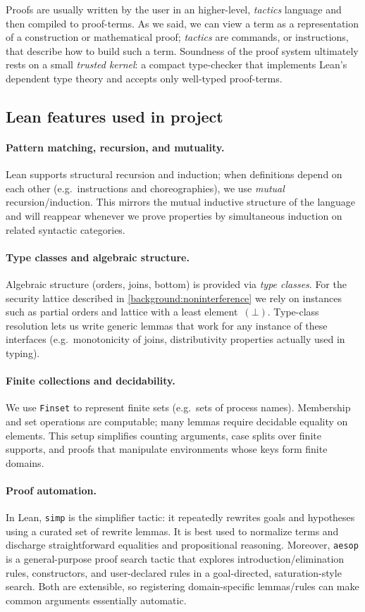 \documentclass[12pt,a4paper,twoside]{book}
\begin{document}
Proofs are usually written by the user in an higher-level, \emph{tactics} language and then compiled to proof-terms. 
As we said, we can view a term as a representation of a construction or mathematical proof; \emph{tactics} are commands, or instructions, that describe how to build such a term.
Soundness of the proof system ultimately rests on a small \emph{trusted kernel}: a compact type-checker that implements Lean's dependent type theory and accepts only well-typed proof-terms\cite{de2015lean}.

\subsection{Lean features used in project}
\paragraph{Pattern matching, recursion, and mutuality.}
Lean supports structural recursion and induction; when definitions depend on each other (e.g.\ instructions and choreographies), we use \emph{mutual} recursion/induction.
This mirrors the mutual inductive structure of the language and will reappear whenever we prove properties by simultaneous induction on related syntactic categories.

\paragraph{Type classes and algebraic structure.}
Algebraic structure (orders, joins, bottom) is provided via \emph{type classes}.
For the security lattice described in \ref{background:noninterference} we rely on instances such as partial orders and lattice with a least element~\((\bot)\).
Type-class resolution lets us write generic lemmas that work for any instance of these interfaces (e.g.\ monotonicity of joins, distributivity properties actually used in typing).

\paragraph{Finite collections and decidability.}
We use \texttt{Finset} to represent finite sets (e.g.\ sets of process names).
Membership and set operations are computable; many lemmas require decidable equality on elements.
This setup simplifies counting arguments, case splits over finite supports, and proofs that manipulate environments whose keys form finite domains.

\paragraph{Proof automation.} In Lean, \texttt{simp} is the simplifier tactic: it repeatedly rewrites goals and hypotheses using a curated set of rewrite lemmas. It is best used to normalize terms and discharge straightforward equalities and propositional reasoning. Moreover, \texttt{aesop} is a general-purpose proof search tactic that explores introduction/elimination rules, constructors, and user-declared rules in a goal-directed, saturation-style search\cite{limperg2023aesop}. Both are extensible, so registering domain-specific lemmas/rules can make common arguments essentially automatic.
\end{document}
